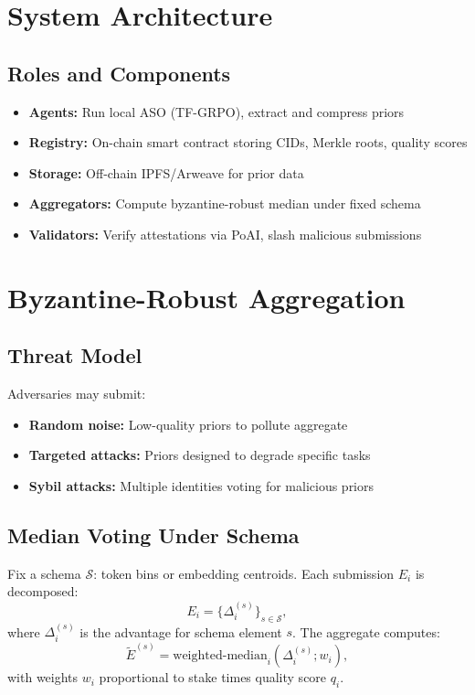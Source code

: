 \documentclass[11pt]{article}
\begin{document}
\section{System Architecture}
\subsection{Roles and Components}
\begin{itemize}[leftmargin=1.1em]
  \item \textbf{Agents:} Run local ASO (TF-GRPO), extract and compress priors
  \item \textbf{Registry:} On-chain smart contract storing CIDs, Merkle roots, quality scores
  \item \textbf{Storage:} Off-chain IPFS/Arweave for prior data
  \item \textbf{Aggregators:} Compute byzantine-robust median under fixed schema
  \item \textbf{Validators:} Verify attestations via PoAI, slash malicious submissions
\end{itemize}

\section{Byzantine-Robust Aggregation}
\subsection{Threat Model}
Adversaries may submit:
\begin{itemize}[leftmargin=1.1em]
  \item \textbf{Random noise:} Low-quality priors to pollute aggregate
  \item \textbf{Targeted attacks:} Priors designed to degrade specific tasks
  \item \textbf{Sybil attacks:} Multiple identities voting for malicious priors
\end{itemize}

\subsection{Median Voting Under Schema}
Fix a schema \(\mathcal{S}\): token bins or embedding centroids. Each submission \(E_i\) is decomposed:
\begin{equation}
E_i = \{\Delta_i^{(s)}\}_{s \in \mathcal{S}},
\end{equation}
where \(\Delta_i^{(s)}\) is the advantage for schema element \(s\). The aggregate computes:
\begin{equation}
\tilde{E}^{(s)} = \text{weighted-median}_i(\Delta_i^{(s)}; w_i),
\end{equation}
with weights \(w_i\) proportional to stake times quality score \(q_i\).
\end{document}
